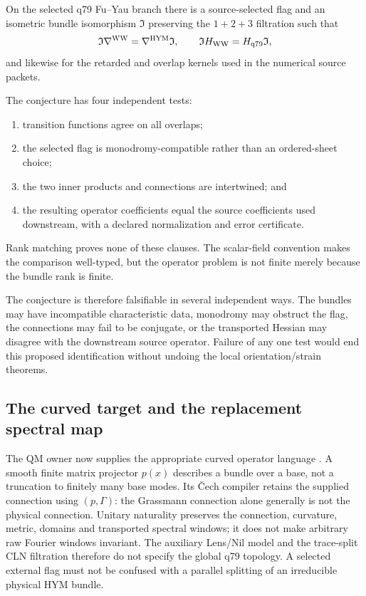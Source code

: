 \documentclass[11pt]{article}
\begin{document}
\begin{conjecture}
On the selected q79 Fu--Yau branch there is a source-selected flag and an
isometric bundle isomorphism $\mathfrak I$ preserving the $1+2+3$ filtration
such that
\[
 \mathfrak I\nabla^{\rm WW}=\nabla^{\rm HYM}\mathfrak I,
 \qquad
 \mathfrak I H_{\rm WW}=H_{\rm q79}\mathfrak I,
\]
and likewise for the retarded and overlap kernels used in the numerical
source packets.
\end{conjecture}

The conjecture has four independent tests:
\begin{enumerate}
\item transition functions agree on all overlaps;
\item the selected flag is monodromy-compatible rather than an ordered-sheet
choice;
\item the two inner products and connections are intertwined; and
\item the resulting operator coefficients equal the source coefficients used
downstream, with a declared normalization and error certificate.
\end{enumerate}

Rank matching proves none of these clauses. The scalar-field convention
makes the comparison well-typed, but the operator problem is not finite merely
because the bundle rank is finite.

The conjecture is therefore falsifiable in several independent ways.  The
bundles may have incompatible characteristic data, monodromy may obstruct the
flag, the connections may fail to be conjugate, or the transported Hessian
may disagree with the downstream source operator.  Failure of any one test
would end this proposed identification without undoing the local
orientation/strain theorems.

\subsection{The curved target and the replacement spectral map}
\label{sec:consumer-geometry}
The QM owner now supplies the appropriate curved operator language
\cite{QMGeometry,FrozenProjective,FrozenCech}. A smooth finite matrix
projector $p(x)$ describes a bundle over a base, not a truncation to finitely
many base modes. Its \v{C}ech compiler retains the supplied connection using
$(p,\Gamma)$: the Grassmann connection alone generally is not the physical
connection. Unitary naturality preserves the connection, curvature, metric,
domains and transported spectral windows; it does not make arbitrary raw
Fourier windows invariant. The auxiliary Lens/Nil model and the trace-split
CLN filtration therefore do not specify the global q79 topology. A selected
external flag must not be confused with a parallel splitting of an irreducible
physical HYM bundle.
\end{document}
